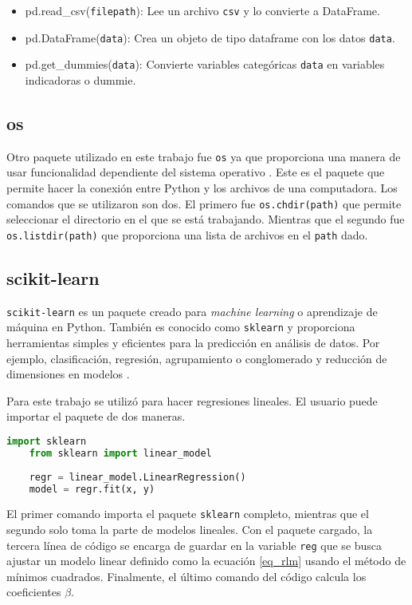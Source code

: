 \begin{itemize}
	\item pd.read\_csv(\texttt{filepath}): Lee un archivo \texttt{csv} y lo convierte a DataFrame.
	
	\item pd.DataFrame(\texttt{data}): Crea un objeto de tipo dataframe con los datos \texttt{data}. 
	
	\item pd.get\_dummies(\texttt{data}): Convierte variables categóricas \texttt{data} en variables indicadoras o dummie. 
\end{itemize}

\subsection{os}
Otro paquete utilizado en este trabajo fue \texttt{os} ya que proporciona una manera de usar funcionalidad dependiente del sistema operativo \cite{doc_python}. Este es el paquete que permite hacer la conexión entre \textsf{Python} y los archivos de una computadora. Los comandos que se utilizaron son dos. El primero fue \texttt{os.chdir(path)} que permite seleccionar el directorio en el que se está trabajando. Mientras que el segundo fue \texttt{os.listdir(path)} que proporciona una lista de archivos en el \texttt{path} dado. 


\subsection{scikit-learn} \label{sec_sklearn}
\texttt{scikit-learn} es un paquete creado para \textit{machine learning} o aprendizaje de máquina en \textsf{Python}. También es conocido como \texttt{sklearn} y proporciona herramientas simples y eficientes para la predicción en análisis de datos. Por ejemplo, clasificación, regresión, agrupamiento o conglomerado y reducción de dimensiones en modelos \cite{doc_python}.

Para este trabajo se utilizó para hacer regresiones lineales. El usuario puede importar el paquete de dos maneras. 

\begin{lstlisting}[language=Python]
	import sklearn
	from sklearn import linear_model
	
	regr = linear_model.LinearRegression()
	model = regr.fit(x, y)
\end{lstlisting}

El primer comando importa el paquete \texttt{sklearn} completo, mientras que el segundo solo toma la parte de modelos lineales. Con el paquete cargado, la tercera línea de código se encarga de guardar en la variable \texttt{reg} que se busca ajustar un modelo linear definido como la ecuación \ref{eq_rlm} usando el método de mínimos cuadrados. Finalmente, el último comando del código calcula los coeficientes $\beta$. 

